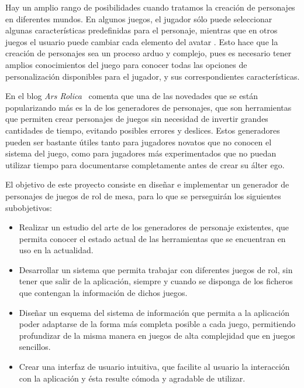Hay un amplio rango de posibilidades cuando tratamos la creación de personajes en diferentes mundos. En algunos juegos, el jugador 
sólo puede seleccionar algunas características predefinidas para el personaje, mientras que en otros juegos el usuario puede cambiar cada
elemento del avatar \autocite*{Isaksson2012}. Esto hace que la creación de personajes sea un proceso arduo y complejo, pues es necesario 
tener amplios conocimientos del juego para conocer todas las opciones de personalización disponibles para el jugador, y sus correspondientes 
características. \medskip

En el blog \textit{Ars Rolica}~\autocite*{ArsRolica} comenta que una de las novedades que se están popularizando más es la de los 
generadores de personajes, que son herramientas que permiten crear personajes de juegos sin necesidad de invertir grandes cantidades 
de tiempo, evitando posibles errores y deslices. Estos generadores pueden ser bastante útiles tanto para jugadores novatos que no 
conocen el sistema del juego, como para jugadores más experimentados que no puedan utilizar tiempo para documentarse completamente 
antes de crear su álter ego. \medskip

El objetivo de este proyecto consiste en diseñar e implementar un generador de personajes de juegos de rol de mesa, para lo que se 
perseguirán los siguientes subobjetivos:
\begin{itemize}

    \item Realizar un estudio del arte de los generadores de personaje existentes, que permita conocer el estado actual de las herramientas
    que se encuentran en uso en la actualidad.

    \item Desarrollar un sistema que permita trabajar con diferentes juegos de rol, sin tener que salir de la aplicación, siempre y 
    cuando se disponga de los ficheros que contengan la información de dichos juegos.

    \item Diseñar un esquema del sistema de información que permita a la aplicación poder adaptarse de la forma más completa posible a 
    cada juego, permitiendo profundizar de la misma manera en juegos de alta complejidad que en juegos sencillos.

    \item Crear una interfaz de usuario intuitiva, que facilite al usuario la interacción con la aplicación y ésta resulte cómoda y 
    agradable de utilizar.

\end{itemize}







